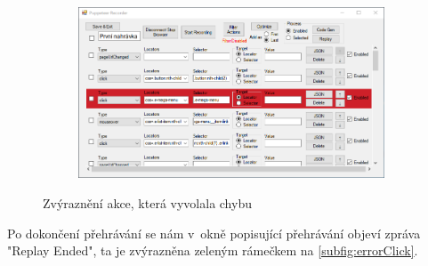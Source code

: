 \documentclass[12pt, a4paper, twoside]{article}
\begin{document}
	\vspace{-0.7cm}
	\begin{figure}[H]\ContinuedFloat
		\centering
		\textdownarrow
	\end{figure}
	\vspace{-0.6cm}
	\begin{figure}[H]\ContinuedFloat
		\centering
		\begin{subfigure}[t]{1.0\textwidth}
			\includegraphics[width=1.0\textwidth]{highlightedError.png}
		\end{subfigure}
		\caption{Zvýraznění akce, která vyvolala chybu}
	\end{figure}
	Po dokončení přehrávání se nám v~okně popisující přehrávání objeví zpráva "Replay Ended", ta je zvýrazněna zeleným rámečkem na \cref{subfig:errorClick}.
	
\end{document}

